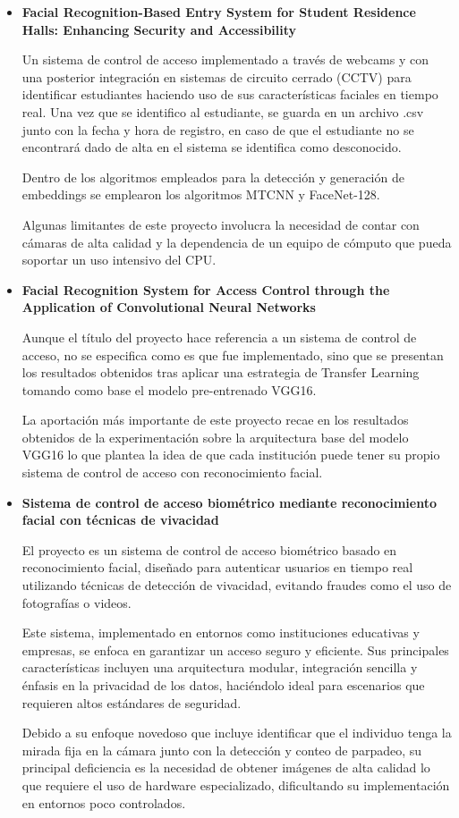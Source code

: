 \begin{itemize}
	
	\item \textbf{Facial Recognition-Based Entry System for Student Residence Halls: Enhancing Security and Accessibility \cite{EA7}}
	
	Un sistema de control de acceso implementado a través de webcams y con una posterior integración en sistemas de circuito cerrado (CCTV) para identificar estudiantes haciendo uso de sus características faciales en tiempo real. 
	Una vez que se identifico al estudiante, se guarda en un archivo .csv junto con la fecha y hora de registro, en caso de que el estudiante no se encontrará dado de alta en el sistema se identifica como desconocido.
	
	Dentro de los algoritmos empleados para la detección y generación de embeddings se emplearon los algoritmos MTCNN y FaceNet-128.
	
	Algunas limitantes de este proyecto involucra la necesidad de contar con cámaras de alta calidad y la dependencia de un equipo de cómputo que pueda soportar un uso intensivo del CPU.
	
	\item \textbf{Facial Recognition System for Access Control through the 
		Application of Convolutional Neural Networks \cite{EA8}}
	
	Aunque el título del proyecto hace referencia a un sistema de control de acceso, no se especifica como es que fue implementado, sino que se presentan los resultados obtenidos tras aplicar una estrategia de Transfer Learning tomando como base el modelo pre-entrenado VGG16.
	
	La aportación más importante de este proyecto recae en los resultados obtenidos de la experimentación sobre la arquitectura base del modelo VGG16 lo que plantea la idea de que cada institución puede tener su propio sistema de control de acceso con reconocimiento facial.
	
	
	\item \textbf{Sistema de control de acceso biométrico mediante reconocimiento facial con técnicas de vivacidad \cite{EA9}}
	
	El proyecto es un sistema de control de acceso biométrico basado en reconocimiento facial, diseñado para autenticar usuarios en tiempo real utilizando técnicas de detección de vivacidad, evitando fraudes como el uso de fotografías o videos.
	
	Este sistema, implementado en entornos como instituciones educativas y empresas, se enfoca en garantizar un acceso seguro y eficiente. Sus principales características incluyen una arquitectura modular, integración sencilla y énfasis en la privacidad de los datos, haciéndolo ideal para escenarios que requieren altos estándares de seguridad.
	
	Debido a su enfoque novedoso que incluye identificar que el individuo tenga la mirada fija en la cámara junto con la detección y conteo de parpadeo, su principal deficiencia es la necesidad de obtener imágenes de alta calidad lo que requiere el uso de hardware especializado, dificultando su implementación en entornos poco controlados.

\end{itemize}


